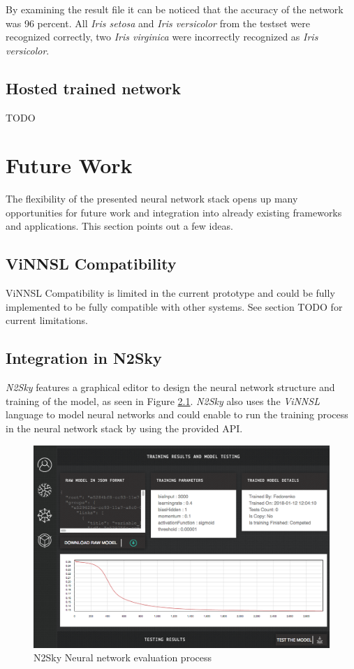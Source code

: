 By examining the result file it can be noticed that the accuracy of the
network was 96 percent. All \emph{Iris setosa} and \emph{Iris
versicolor} from the testset were recognized correctly, two \emph{Iris
virginica} were incorrectly recognized as \emph{Iris versicolor}.

\section{Hosted trained network}\label{hosted-trained-network}

TODO

\chapter{Future Work}\label{future-work}

The flexibility of the presented neural network stack opens up many
opportunities for future work and integration into already existing
frameworks and applications. This section points out a few ideas.

\section{ViNNSL Compatibility}\label{vinnsl-compatibility}

ViNNSL Compatibility is limited in the current prototype and could be
fully implemented to be fully compatible with other systems. See section
TODO for current limitations.

\section{Integration in N2Sky}\label{integration-in-n2sky}

\emph{N2Sky} features a graphical editor to design the neural network
structure and training of the model, as seen in Figure \ref{n2sky_eval}.
\emph{N2Sky} also uses the \emph{ViNNSL} language to model neural
networks and could enable to run the training process in the neural
network stack by using the provided API.

\begin{figure}
\centering
\includegraphics[width=12.00000cm]{images/n2sky_eval}
\caption{N2Sky Neural network evaluation process \cite{n2sky-2}
\label{n2sky_eval}}
\end{figure}

